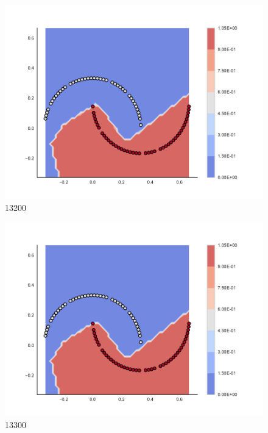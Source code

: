 \begin{subfigure}[b]{0.09\textwidth}
    \includegraphics[clip, trim=2.35cm 1.75cm 4.5cm 0cm,width=\textwidth]{img/convergence/13200.pdf}
    \caption{13200}
    \label{fig:convergence_13200}
\end{subfigure}
%
\begin{subfigure}[b]{0.09\textwidth}
    \includegraphics[clip, trim=2.35cm 1.75cm 4.5cm 0cm,width=\textwidth]{img/convergence/13300.pdf}
    \caption{13300}
    \label{fig:convergence_13300}
\end{subfigure}
%
